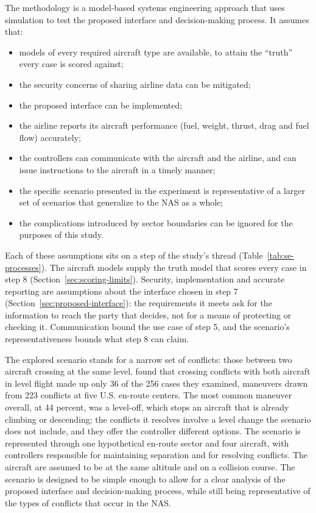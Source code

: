 The methodology is a model-based systems engineering approach that uses simulation to test the proposed interface and decision-making process. It assumes that:
\begin{itemize}
    \item models of every required aircraft type are available, to attain the ``truth'' every case is scored against;
    \item the security concerns of sharing airline data can be mitigated;
    \item the proposed interface can be implemented;
    \item the airline reports its aircraft performance (fuel, weight, thrust, drag and fuel flow) accurately;
    \item the controllers can communicate with the aircraft and the airline, and can issue instructions to the aircraft in a timely manner;
    \item the specific scenario presented in the experiment is representative of a larger set of scenarios that generalize to the NAS as a whole;
    \item the complications introduced by sector boundaries can be ignored for the purposes of this study.
\end{itemize}

Each of these assumptions sits on a step of the study's thread (Table~\ref{tab:se-processes}). The aircraft models supply the truth model that scores every case in step 8 (Section~\ref{sec:scoring-limits}). Security, implementation and accurate reporting are assumptions about the interface chosen in step 7 (Section~\ref{sec:proposed-interface}): the requirements it meets ask for the information to reach the party that decides, not for a means of protecting or checking it. Communication bound the use case of step 5, and the scenario's representativeness bounds what step 8 can claim.

The explored scenario stands for a narrow set of conflicts: those between two aircraft crossing at the same level. \textcite{rantanen2012conflictManeuvers} found that crossing conflicts with both aircraft in level flight made up only 36 of the 256 cases they examined, maneuvers drawn from 223 conflicts at five U.S. en-route centers. The most common maneuver overall, at 44 percent, was a level-off, which stops an aircraft that is already climbing or descending; the conflicts it resolves involve a level change the scenario does not include, and they offer the controller different options. The scenario is represented through one hypothetical en-route sector and four aircraft, with controllers responsible for maintaining separation and for resolving conflicts. The aircraft are assumed to be at the same altitude and on a collision course. The scenario is designed to be simple enough to allow for a clear analysis of the proposed interface and decision-making process, while still being representative of the types of conflicts that occur in the NAS.

